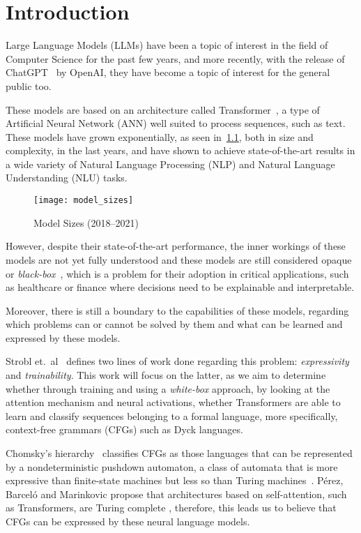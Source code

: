 \chapter{Introduction}

Large Language Models (LLMs) have been a topic of interest in the field of Computer Science for the past few years, and more recently, with the release of ChatGPT~\cite{chatgpt} by OpenAI, they have become a topic of interest for the general public too. 

These models are based on an architecture called Transformer~\cite{attention_is_all_you_need}, a type of Artificial Neural Network (ANN) 
well suited to process sequences, such as text. These models have grown exponentially, as seen in~\ref{fig:model_sizes}, both in size and complexity, in the last years, and 
have shown to achieve state-of-the-art results in a wide variety of Natural Language Processing (NLP) and Natural Language Understanding (NLU) tasks.

\begin{figure}[H]
    \centering
    \texttt{[image: model\_sizes]}
    \caption{Model Sizes (2018--2021)~\cite{model_sizes}}
    \label{fig:model_sizes}
\end{figure}

However, despite their state-of-the-art performance, the inner workings of these models are not yet fully understood and these models are still considered opaque or \emph{black-box}~\cite{lei-etal-2016-rationalizing}, which is a problem for their adoption in critical applications, such as healthcare or finance where decisions need to be explainable and interpretable. 

Moreover, there is still a boundary to the capabilities of these models, regarding which problems can or cannot be solved by them and what can be learned and expressed by these models.

Strobl et.\ al\ \cite{strobl2024formal} defines two lines of work done regarding this problem: \textit{expressivity} and \textit{trainability}. This work will focus on the latter, as we aim to determine whether through training and using a \textit{white-box} approach, by looking at the attention mechanism and neural activations, whether Transformers are able to learn and classify sequences belonging to a formal language, more specifically, context-free grammars (CFGs) such as Dyck languages.

Chomsky's hierarchy\ \cite{chomsky-hierarchy} classifies CFGs as those languages that can be represented by a nondeterministic pushdown automaton, a class of automata that is more expressive than finite-state machines but less so than Turing machines~\cite{context-free-chomsky}. Pérez, Barceló and Marinkovic propose that architectures based on self-attention, such as Transformers, are Turing complete \cite{attention-tc}, therefore, this leads us to believe that CFGs can be expressed by these neural language models.

